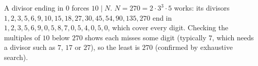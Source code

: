 A divisor ending in $0$ forces $10\mid N$. $N=270=2\cdot3^3\cdot5$ works: its divisors $1,2,3,5,6,9,10,15,18,27,30,45,54,90,135,270$ end in $1,2,3,5,6,9,0,5,8,7,0,5,4,0,5,0$, which cover every digit. Checking the multiples of $10$ below $270$ shows each misses some digit (typically $7$, which needs a divisor such as $7$, $17$ or $27$), so the least is $\boxed{270}$ (confirmed by exhaustive search).
